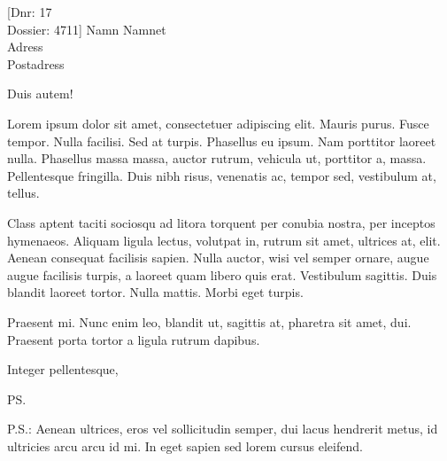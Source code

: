 \documentclass{scilife-brev}
\begin{document}
\begin{letter}[Dnr: 17\\Dossier: 4711]
              {Namn Namnet\\
               Adress\\
               Postadress}
\opening{Duis autem!}

Lorem ipsum dolor sit amet, consectetuer adipiscing elit. Mauris
purus. Fusce tempor. Nulla facilisi. Sed at turpis. Phasellus eu
ipsum. Nam porttitor laoreet nulla. Phasellus massa massa, auctor
rutrum, vehicula ut, porttitor a, massa. Pellentesque fringilla. Duis
nibh risus, venenatis ac, tempor sed, vestibulum at, tellus.

Class aptent taciti sociosqu ad litora torquent per conubia nostra,
per inceptos hymenaeos. Aliquam ligula lectus, volutpat in, rutrum sit
amet, ultrices at, elit. Aenean consequat facilisis sapien. Nulla
auctor, wisi vel semper ornare, augue augue facilisis turpis, a
laoreet quam libero quis erat. Vestibulum sagittis. Duis blandit
laoreet tortor. Nulla mattis. Morbi eget turpis.

Praesent mi. Nunc enim leo, blandit ut, sagittis at, pharetra sit
amet, dui. Praesent porta tortor a ligula rutrum dapibus.

\closing{Integer pellentesque,}
\ps

P.S.:
Aenean ultrices, eros vel sollicitudin semper, dui lacus hendrerit
metus, id ultricies arcu arcu id mi. In eget sapien sed lorem cursus
eleifend.

\end{letter}
\end{document}
